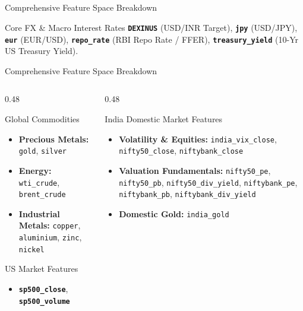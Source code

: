 \documentclass[aspectratio=169]{beamer}
\begin{document}
\subsection*{}

\begin{frame}{Comprehensive Feature Space Breakdown}
	\begin{block}{Core FX \& Macro Interest Rates}
		\textbf{\texttt{DEXINUS}} (USD/INR Target), \textbf{\texttt{jpy}} (USD/JPY), \textbf{\texttt{eur}} (EUR/USD), \textbf{\texttt{repo\_rate}} (RBI Repo Rate / FFER), \textbf{\texttt{treasury\_yield}} (10-Yr US Treasury Yield).
	\end{block}
\end{frame}

\begin{frame}{Comprehensive Feature Space Breakdown}

	\begin{columns}[T]
		\begin{column}{0.48\textwidth}
			\begin{block}{Global Commodities}
				\begin{itemize}
					\item \textbf{Precious Metals:} \texttt{gold}, \texttt{silver}
					\item \textbf{Energy:} \texttt{wti\_crude}, \texttt{brent\_crude}
					\item \textbf{Industrial Metals:} \texttt{copper}, \texttt{aluminium}, \texttt{zinc}, \texttt{nickel}
				\end{itemize}
			\end{block}
			\begin{block}{US Market Features}
				\begin{itemize}
					\item \textbf{\texttt{sp500\_close}}, \textbf{\texttt{sp500\_volume}}
				\end{itemize}
			\end{block}
		\end{column}
		\begin{column}{0.48\textwidth}
			\begin{block}{India Domestic Market Features}
				\begin{itemize}
					\item \textbf{Volatility \& Equities:} \texttt{india\_vix\_close}, \texttt{nifty50\_close}, \texttt{niftybank\_close}
					\item \textbf{Valuation Fundamentals:} \texttt{nifty50\_pe}, \texttt{nifty50\_pb}, \texttt{nifty50\_div\_yield}, \texttt{niftybank\_pe}, \texttt{niftybank\_pb}, \texttt{niftybank\_div\_yield}
					\item \textbf{Domestic Gold:} \texttt{india\_gold}
				\end{itemize}
			\end{block}
		\end{column}
	\end{columns}
\end{frame}
\end{document}

